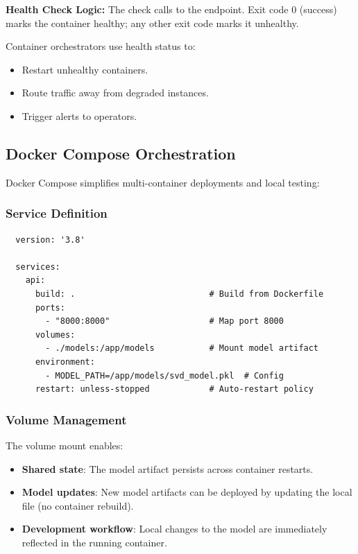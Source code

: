\textbf{Health Check Logic:}
The check calls  to the  endpoint. Exit code 0 (success) marks the container healthy; 
any other exit code marks it unhealthy.

Container orchestrators use health status to:
\begin{itemize}
  \item Restart unhealthy containers.
  \item Route traffic away from degraded instances.
  \item Trigger alerts to operators.
\end{itemize}

\subsection{Docker Compose Orchestration}

Docker Compose simplifies multi-container deployments and local testing:

\subsubsection{Service Definition}

\begin{verbatim}
  version: '3.8'
  
  services:
    api:
      build: .                           # Build from Dockerfile
      ports:
        - "8000:8000"                    # Map port 8000
      volumes:
        - ./models:/app/models           # Mount model artifact
      environment:
        - MODEL_PATH=/app/models/svd_model.pkl  # Config
      restart: unless-stopped            # Auto-restart policy
\end{verbatim}

\subsubsection{Volume Management}

The  volume mount enables:

\begin{itemize}
  \item \textbf{Shared state}: The model artifact persists across container restarts.
  
  \item \textbf{Model updates}: New model artifacts can be deployed by updating the local file 
  (no container rebuild).
  
  \item \textbf{Development workflow}: Local changes to the model are immediately reflected in the 
  running container.
\end{itemize}

